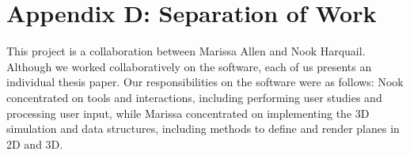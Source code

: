 \section{Appendix D: Separation of
Work}\label{appendix-d-separation-of-work}

This project is a collaboration between Marissa Allen and Nook Harquail.
Although we worked collaboratively on the software, each of us presents
an individual thesis paper. Our responsibilities on the software were as
follows: Nook concentrated on tools and interactions, including
performing user studies and processing user input, while Marissa
concentrated on implementing the 3D simulation and data structures,
including methods to define and render planes in 2D and 3D.
